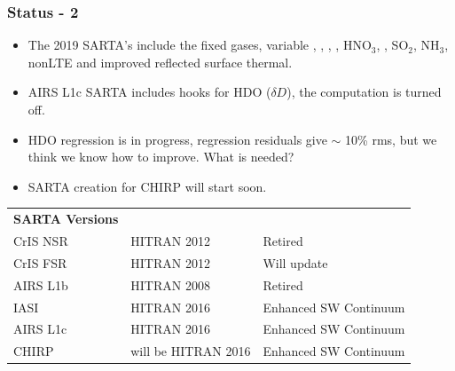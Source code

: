 \documentclass[10pt,t]{beamer}
\begin{document}
\begin{frame}
  \frametitle{Status - 2}
  \begin{itemize}
  \item The 2019 SARTA's include the fixed gases, variable \ozone, \water, \cd, \methane, HNO$_3$, \nitrous, SO$_2$, NH$_3$, nonLTE and improved reflected surface thermal. 
  \item AIRS L1c SARTA includes hooks for HDO ($\delta D$), the computation is turned off.
  \item HDO  regression is in progress, regression residuals give $\sim$ 10\% rms, but we think we know how to improve.  What is needed?
  \item SARTA creation for CHIRP will start soon.
  \end{itemize}
\begin{footnotesize}
\vspace{0.1in}
\begin{tabular}{lll}
  \textbf{SARTA Versions} & & \\
  CrIS NSR & HITRAN 2012 & Retired \\
  CrIS FSR & HITRAN 2012 & Will update\\
  AIRS L1b & HITRAN 2008 & Retired \\
  IASI     & HITRAN 2016 & Enhanced SW Continuum\\
  AIRS L1c & HITRAN 2016 & Enhanced SW Continuum \\
  CHIRP    & will be HITRAN 2016 & Enhanced SW Continuum
\end{tabular}
\end{footnotesize}
  

\end{frame}

    
\end{document}
